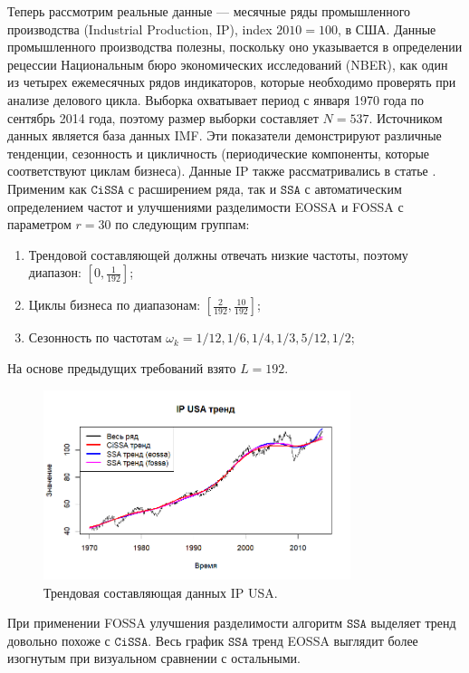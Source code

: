 \documentclass[12pt, specialist, subf
]{disser}
\theoremstyle{definition}
\newcommand{\SSA}{\texttt{SSA}}
\newcommand{\CISSA}{\texttt{CiSSA}}
\begin{document}
Теперь рассмотрим реальные данные --- месячные ряды промышленного производства (Industrial Production, IP), index $2010 = 100$, в США. Данные промышленного производства полезны, поскольку оно указывается в определении рецессии Национальным бюро экономических исследований (NBER), как один из четырех ежемесячных рядов индикаторов, которые необходимо проверять при анализе делового цикла. Выборка охватывает период с января 1970 года по сентябрь 2014 года, поэтому размер выборки составляет $N = 537$. Источником данных является база данных IMF. Эти показатели демонстрируют различные тенденции, сезонность и цикличность (периодические компоненты, которые соответствуют циклам бизнеса). Данные IP также рассматривались в статье \cite{bogalo2020}.
Применим как $\CISSA$ с расширением ряда, так и $\SSA$ с автоматическим определением частот и улучшениями разделимости EOSSA и FOSSA с параметром $r = 30$ по следующим группам:
\begin{enumerate}
	\item Трендовой составляющей должны отвечать низкие частоты, поэтому диапазон: $\left[0, \frac{1}{192}\right]$;
	\item Циклы бизнеса по диапазонам: $\left[\frac{2}{192}, \frac{10}{192}\right]$;
	\item Сезонность по частотам $\omega_k = 1/12, 1/6, 1/4, 1/3, 5/12, 1/2$;
\end{enumerate}
На основе предыдущих требований взято $L = 192$.

\begin{figure}[H]
	\centering
	\includegraphics[width=0.8\textwidth]{img/trend inseparability example/IP_trend.png}
	\caption{Трендовая составляющая данных IP USA.}
	\label{fig:IP_trend}
\end{figure}

При применении FOSSA улучшения разделимости алгоритм $\SSA$ выделяет тренд довольно похоже с $\CISSA$. Весь график $\SSA$ тренд EOSSA выглядит более изогнутым при визуальном сравнении с остальными.
\end{document}
